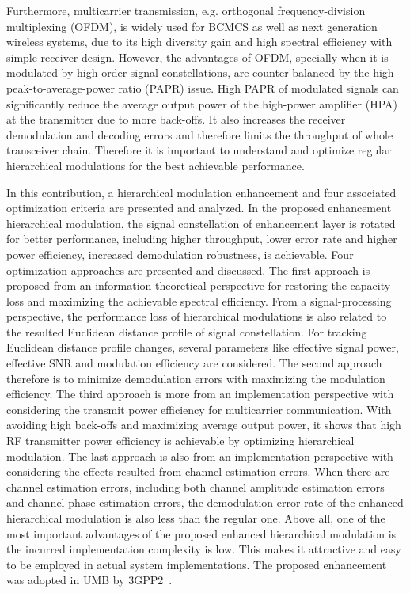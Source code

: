 \documentclass[conference]{IEEEtran}
\begin{document}
Furthermore, multicarrier transmission, e.g. orthogonal
frequency-division multiplexing (OFDM), is widely used for BCMCS
as well as next generation wireless systems, due to its high
diversity gain and high spectral efficiency with simple receiver
design. However, the advantages of OFDM, specially when it is
modulated by high-order signal constellations, are
counter-balanced by the high peak-to-average-power ratio (PAPR)
issue. High PAPR of modulated signals can significantly reduce the
average output power of the high-power amplifier (HPA) at the
transmitter due to more back-offs. It also increases the receiver
demodulation and decoding errors and therefore limits the
throughput of whole transceiver chain. Therefore it is important
to understand and optimize regular hierarchical modulations for
the best achievable performance.

In this contribution, a hierarchical modulation enhancement and
four associated optimization criteria are presented and analyzed.
In the proposed enhancement hierarchical modulation, the signal
constellation of enhancement layer is rotated for better
performance, including higher throughput, lower error rate and
higher power efficiency, increased demodulation robustness, is
achievable. Four optimization approaches are presented and
discussed. The first approach is proposed from an
information-theoretical perspective for restoring the capacity
loss and maximizing the achievable spectral efficiency. From a
signal-processing perspective, the performance loss of
hierarchical modulations is also related to the resulted Euclidean
distance profile of signal constellation. For tracking Euclidean
distance profile changes, several parameters like effective signal
power, effective SNR and modulation efficiency are considered. The
second approach therefore is to minimize demodulation errors with
maximizing the modulation efficiency. The third approach is more
from an implementation perspective with considering the transmit
power efficiency for multicarrier communication. With avoiding
high back-offs and maximizing average output power, it shows that
high RF transmitter power efficiency is achievable by optimizing
hierarchical modulation. The last approach is also from an
implementation perspective with considering the effects resulted
from channel estimation errors. When there are channel estimation
errors, including both channel amplitude estimation errors and
channel phase estimation errors, the demodulation error rate of
the enhanced hierarchical modulation is also less than the regular
one. Above all, one of the most important advantages of the
proposed enhanced hierarchical modulation is the incurred
implementation complexity is low. This makes it attractive and
easy to be employed in actual system implementations. The proposed
enhancement was adopted in UMB by 3GPP2~\cite{UMB}.
\end{document}
